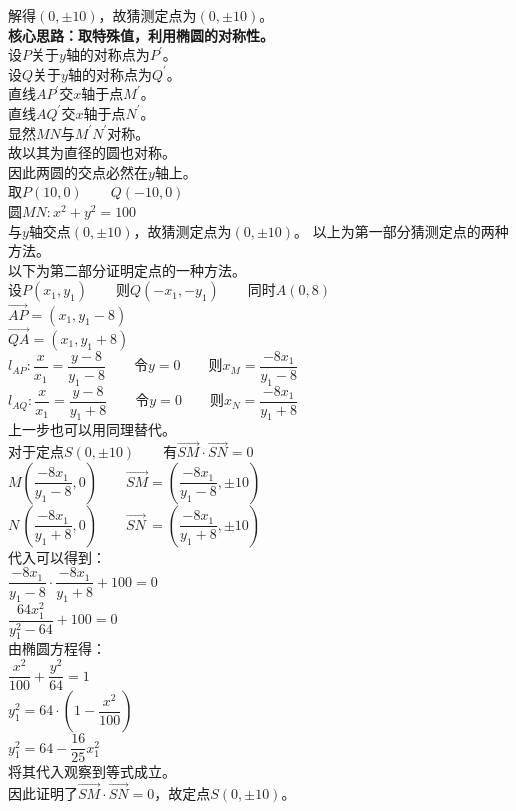 \documentclass[UTF8]{ctexart}
\begin{document}
\begin{multicols}{2}
\begin{math}
        \end{math}\\[5mm]
        解得$(0,\pm 10)$，故猜测定点为$(0,\pm 10)$。\\[20mm]
        \textbf{核心思路：取特殊值，利用椭圆的对称性。}\\[4mm]
        设$P$关于$y$轴的对称点为$P^{'}$。\\[5mm]
        设$Q$关于$y$轴的对称点为$Q^{'}$。\\[5mm]
        直线$AP^{'}$交$x$轴于点$M^{'}$。\\[5mm]
        直线$AQ^{'}$交$x$轴于点$N^{'}$。\\[5mm]
        显然$MN$与$M^{'}N^{'}$对称。\\[5mm]
        故以其为直径的圆也对称。\\[5mm]
        因此两圆的交点必然在$y$轴上。\\[5mm]
        取$P(10,0)$~~~~$Q(-10,0)$\\[5mm]
        圆$MN:x^2+y^2=100$\\[5mm]
        与$y$轴交点$(0,\pm 10)$，故猜测定点为$(0,\pm 10)$。
        \newpage
        以上为第一部分猜测定点的两种方法。\\[5mm]
        以下为第二部分证明定点的一种方法。\\[5mm]        
        设$P(x_1,y_1)$~~~~则$Q(-x_1,-y_1)$~~~~同时$A(0,8)$\\[5mm]
        $\overrightarrow{AP}=(x_1,y_1-8)$\\[5mm]
        $\overrightarrow{QA}=(x_1,y_1+8)$\\[5mm]
        $l_{AP}:\dfrac{x}{x_1}=\dfrac{y-8}{y_1-8}$~~~~令$y=0$~~~~则$x_M=\dfrac{-8x_1}{y_1-8}$\\[5mm]
        $l_{AQ}:\dfrac{x}{x_1}=\dfrac{y-8}{y_1+8}$~~~~令$y=0$~~~~则$x_N=\dfrac{-8x_1}{y_1+8}$\\[5mm]
        上一步也可以用同理替代。\\[8mm]
        对于定点$S(0,\pm 10)$~~~~有$\overrightarrow{SM}\cdot\overrightarrow{SN}=0$\\[5mm]
        $M\left(\dfrac{-8x_1}{y_1-8},0\right)$~~~~$\overrightarrow{SM}=\left(\dfrac{-8x_1}{y_1-8},\pm 10\right)$\\[5mm]
        $N\,\left(\dfrac{-8x_1}{y_1+8},0\right)$~~~~$\overrightarrow{SN}\,=\left(\dfrac{-8x_1}{y_1+8},\pm 10\right)$\\[8mm]
        代入可以得到：\\[5mm]
        $\dfrac{-8x_1}{y_1-8}\cdot\dfrac{-8x_1}{y_1+8}+100=0$\\[5mm]
        $\dfrac{64x_1^2}{y_1^2-64}+100=0$\\[8mm]
        由椭圆方程得：\\[5mm]
        $\dfrac{x^2}{100}+\dfrac{y^2}{64}=1$\\[5mm]
        $y_1^2=64\cdot\left(1-\dfrac{x^2}{100}\right)$\\[5mm]
        $y_1^2=64-\dfrac{16}{25}x_1^2$\\[8mm]
        将其代入观察到等式成立。\\[5mm]
        因此证明了$\overrightarrow{SM}\cdot\overrightarrow{SN}=0$，故定点$S(0,\pm 10)。$\\[5mm]
        \newpage
    \end{multicols}
\end{document}
